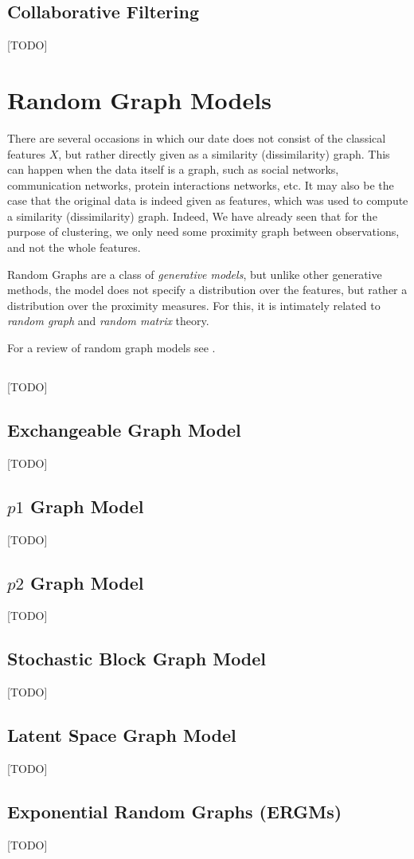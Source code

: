 \subsection{Collaborative Filtering}
\label{sec:collaborative_filtering}
[TODO]





\section{Random Graph Models}
\label{sec:random_graphs}

There are several occasions in which our date does not consist of the classical features $X$, but rather directly given as a similarity (dissimilarity) graph. This can happen when the data itself is a graph, such as social networks, communication networks, protein interactions networks, etc. It may also be the case that the original data is indeed given as features, which was used to compute a similarity (dissimilarity) graph. Indeed, We have already seen that for the purpose of clustering, we only need some proximity graph between observations, and not the whole features. 

Random Graphs are a class of \emph{generative models}, but unlike other generative methods, the model does not specify a distribution over the features, but rather a distribution over the proximity measures.
For this, it is  intimately related to \emph{random graph} and \emph{random matrix} theory.

For a review of random graph models see \cite{goldenberg_survey_2010}.


\subsection{\erdos \renyi}
[TODO]

\subsection{Exchangeable Graph Model}
[TODO]

\subsection{$p1$ Graph Model}
[TODO]

\subsection{$p2$ Graph Model}
[TODO]

\subsection{Stochastic Block Graph Model}
[TODO]

\subsection{Latent Space Graph Model}
[TODO]

\subsection{Exponential Random Graphs (ERGMs)}
[TODO]

\begin{remark}
\end{remark}

